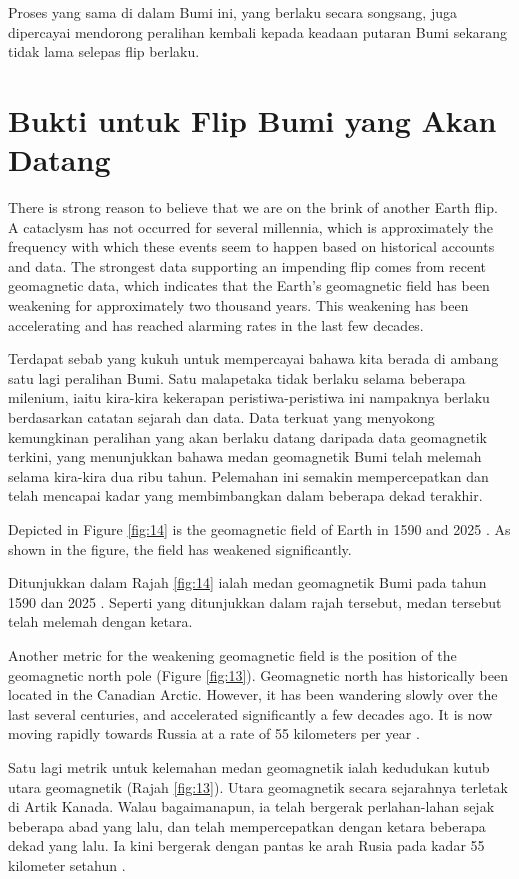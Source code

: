 \documentclass[10pt,twocolumn,letterpaper]{article}
\begin{document}
Proses yang sama di dalam Bumi ini, yang berlaku secara songsang, juga dipercayai mendorong peralihan kembali kepada keadaan putaran Bumi sekarang tidak lama selepas flip berlaku.

\section{Bukti untuk Flip Bumi yang Akan Datang}
There is strong reason to believe that we are on the brink of another Earth flip. A cataclysm has not occurred for several millennia, which is approximately the frequency with which these events seem to happen based on historical accounts and data. The strongest data supporting an impending flip comes from recent geomagnetic data, which indicates that the Earth's geomagnetic field has been weakening for approximately two thousand years. This weakening has been accelerating and has reached alarming rates in the last few decades.

Terdapat sebab yang kukuh untuk mempercayai bahawa kita berada di ambang satu lagi peralihan Bumi. Satu malapetaka tidak berlaku selama beberapa milenium, iaitu kira-kira kekerapan peristiwa-peristiwa ini nampaknya berlaku berdasarkan catatan sejarah dan data. Data terkuat yang menyokong kemungkinan peralihan yang akan berlaku datang daripada data geomagnetik terkini, yang menunjukkan bahawa medan geomagnetik Bumi telah melemah selama kira-kira dua ribu tahun. Pelemahan ini semakin mempercepatkan dan telah mencapai kadar yang membimbangkan dalam beberapa dekad terakhir.

Depicted in Figure \ref{fig:14} is the geomagnetic field of Earth in 1590 and 2025 \cite{125,126}. As shown in the figure, the field has weakened significantly.

Ditunjukkan dalam Rajah \ref{fig:14} ialah medan geomagnetik Bumi pada tahun 1590 dan 2025 \cite{125,126}. Seperti yang ditunjukkan dalam rajah tersebut, medan tersebut telah melemah dengan ketara.

Another metric for the weakening geomagnetic field is the position of the geomagnetic north pole (Figure \ref{fig:13}). Geomagnetic north has historically been located in the Canadian Arctic. However, it has been wandering slowly over the last several centuries, and accelerated significantly a few decades ago. It is now moving rapidly towards Russia at a rate of 55 kilometers per year \cite{124}.

Satu lagi metrik untuk kelemahan medan geomagnetik ialah kedudukan kutub utara geomagnetik (Rajah \ref{fig:13}). Utara geomagnetik secara sejarahnya terletak di Artik Kanada. Walau bagaimanapun, ia telah bergerak perlahan-lahan sejak beberapa abad yang lalu, dan telah mempercepatkan dengan ketara beberapa dekad yang lalu. Ia kini bergerak dengan pantas ke arah Rusia pada kadar 55 kilometer setahun \cite{124}.
\end{document}

